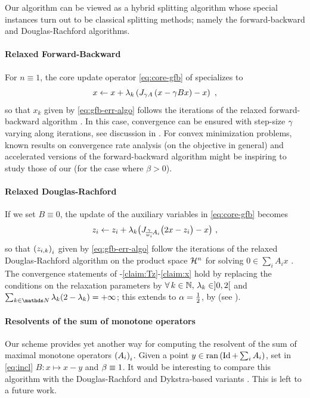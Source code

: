 Our \GFB algorithm can be viewed as a hybrid splitting algorithm whose special instances turn out to be classical splitting methods; namely the forward-backward and Douglas-Rachford algorithms.

\paragraph{Relaxed Forward-Backward}
For $n \equiv 1$, the core update operator \eqref{eq:core-gfb} of  specializes to
%
\begin{equation*}
	x \leftarrow x + \lambda_k \left(  J_{\gamma A} \left(  x - \gamma B x  \right) - x  \right)~,
\end{equation*}
%
so that $x_k$ given by \eqref{eq:gfb-err-algo} follows the iterations of the relaxed forward-backward algorithm \cite[Section~6]{Combettes04}. In this case, convergence can be ensured with step-size $\gamma$ varying along iterations, see discussion in . For convex minimization problems, known results on convergence rate analysis (on the objective in general) and accelerated versions of the forward-backward algorithm \cite{BeckTeboulle09,Bredies08,Nesterov07,Tseng08} might be inspiring to study those of our \GFB (for the case where $\beta > 0$).

\paragraph{Relaxed Douglas-Rachford}
If we set $B \equiv 0$, the update of the auxiliary variables in \eqref{eq:core-gfb} becomes
%
%
\begin{equation*}
z_i \leftarrow z_i + \lambda_k \big(  J_{\!\frac{\gamma}{w_i}\!A_i} \big(  2x - z_i  \big) - x \big)~,
\end{equation*}
% 
so that $\left( z_{i,k} \right)_i$ given by \eqref{eq:gfb-err-algo} follow the iterations of the relaxed Douglas-Rachford algorithm on the product space $\mathcal{H}^n$ for solving $0 \in \sum_i A_i x$ \cite{CombettesPesquet08,Spingarn83}. The convergence statements of -\ref{claim:Tz}-\ref{claim:x} hold by replacing the conditions on the relaxation parameters by $\forall \, k \in \mathbb{N}, \, \lambda_k \in ]0,2[$ and $\sum_{k \in \N} \la_k(2-\la_k) = \pinfty$; this extends  to $\alpha = {\textstyle \frac{1}{2}}$, by  (see ).

\paragraph{Resolvents of the sum of monotone operators}
Our \GFB scheme provides yet another way for computing the resolvent of the sum of maximal monotone operators $\left( A_i \right)_i$. Given a point $y \in \operatorname{ran} \left( \operatorname{Id} + \sum_i A_i \right)$, set in \eqref{eq:incl} $B: x \mapsto x - y$ and $\beta \equiv 1$. It would be interesting to compare this algorithm with the Douglas-Rachford and Dykstra-based variants \cite{Combettes09b}. This is left to a future work.

